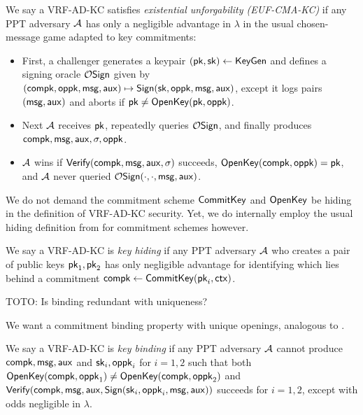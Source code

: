 \begin{definition}
We say a VRF-AD-KC satisfies {\em existential unforgability (EUF-CMA-KC)} if
any PPT adversary $\mathcal{A}$ has only a negligible advantage in $\lambda$
in the usual chosen-message game adapted to key commitments:
\begin{itemize}
 \item First, a challenger
  generates a keypair $(\mathsf{pk},\mathsf{sk}) \leftarrow {\ensuremath{\mathsf{KeyGen}}}$ and
  defines a signing oracle $\mathcal{O}\mathsf{Sign}$ given by
  $(\mathsf{compk},\mathsf{oppk},\mathsf{msg},\mathsf{aux}) \mapsto {\ensuremath{\mathsf{Sign}}}(\mathsf{sk},\mathsf{oppk},\mathsf{msg},\mathsf{aux})$,
   except it logs pairs $(\mathsf{msg},\mathsf{aux})$ and aborts if $\mathsf{pk} \ne {\ensuremath{\mathsf{OpenKey}}}(\mathsf{pk},\mathsf{oppk})$.
 \item Next $\mathcal{A}$ receives $\mathsf{pk}$, repeatedly queries $\mathcal{O}\mathsf{Sign}$,
  and finally produces $\mathsf{compk},\mathsf{msg},\mathsf{aux},\sigma,\mathsf{oppk}$.
 \item $\mathcal{A}$ wins if ${\mathsf{Verify}}(\mathsf{compk},\mathsf{msg},\mathsf{aux},\sigma)$ succeeds,
  ${\mathsf{OpenKey}}(\mathsf{compk},\mathsf{oppk}) = \mathsf{pk}$, and
   $\mathcal{A}$ never queried $\mathcal{O}\mathsf{Sign}(\cdot,\cdot,\mathsf{msg},\mathsf{aux})$.
\end{itemize}
\end{definition}

We do not demand the commitment scheme ${\mathsf{CommitKey}}$ and ${\mathsf{OpenKey}}$
be hiding in the definition of VRF-AD-KC security.
Yet, we do internally employ the usual hiding definition from
\cite[pp.8]{cryptoeprint:2019:1185} for commitment schemes however.

\begin{definition}
We say a VRF-AD-KC is {\em key hiding} if any PPT adversary $\mathcal{A}$
who creates a pair of public keys $\mathsf{pk}_1,\mathsf{pk}_2$
has only negligible advantage for identifying which lies behind a commitment
 $\mathsf{compk} \leftarrow {\ensuremath{\mathsf{CommitKey}}}(\mathsf{pk}_i,\mathsf{ctx})$.
\end{definition}

TOTO: Is binding redundant with uniqueness?

We want a commitment binding property with unique openings,
analogous to \cite[pp.9]{cryptoeprint:2019:1185}.

\begin{definition}
We say a VRF-AD-KC is {\em key binding} if any PPT adversary $\mathcal{A}$
cannot produce $\mathsf{compk},\mathsf{msg},\mathsf{aux}$ and $\mathsf{sk}_i,\mathsf{oppk}_i$ for $i=1,2$
such that both
 ${\mathsf{OpenKey}}(\mathsf{compk},\mathsf{oppk}_1) \ne {\ensuremath{\mathsf{OpenKey}}}(\mathsf{compk},\mathsf{oppk}_2)$ and
 ${\mathsf{Verify}}(\mathsf{compk},\mathsf{msg},\mathsf{aux},{\mathsf{Sign}}(\mathsf{sk}_i,\mathsf{oppk}_i,\mathsf{msg},\mathsf{aux}))$ succeeds for $i=1,2$,
except with odds negligible in $\lambda$.
\end{definition}

